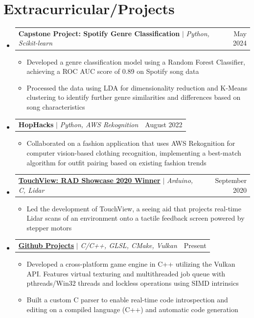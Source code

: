 \documentclass[letterpaper,11pt]{article}
\makeatletter
\newcommand{\resumeItem}[1]{
  \item\small{
    {#1 \vspace{-2pt}}
  }
}
\newcommand{\resumeProjectHeading}[2]{
    \item
    \begin{tabular*}{0.97\textwidth}{l@{\extracolsep{\fill}}r}
      \small#1 & #2 \\
    \end{tabular*}\vspace{-7pt}
}
\newcommand{\resumeSubHeadingListStart}{\begin{itemize}[leftmargin=0.15in, label={}]}
\newcommand{\resumeSubHeadingListEnd}{\end{itemize}}
\newcommand{\resumeItemListStart}{\begin{itemize}}
\newcommand{\resumeItemListEnd}{\end{itemize}\vspace{-5pt}}
\makeatother
\begin{document}
\section{Extracurricular/Projects} %
    \resumeSubHeadingListStart

        \resumeProjectHeading
        {\textbf{Capstone Project: Spotify Genre Classification} $|$ \footnotesize\emph{Python, Scikit-learn}}{May 2024}
        \resumeItemListStart
            \resumeItem{Developed a genre classification model using a Random Forest Classifier, achieving a ROC AUC score of 0.89 on Spotify song data}
            \resumeItem{Processed the data using LDA for dimensionality reduction and K-Means clustering to identify further genre similarities and differences based on song characteristics}
        \resumeItemListEnd
    
          
        \resumeProjectHeading
        {\textbf{HopHacks} $|$ \footnotesize\emph{Python, AWS Rekognition}}{August 2022}
        \resumeItemListStart
            \resumeItem{Collaborated on a fashion application that uses AWS Rekognition for computer vision-based clothing recognition, implementing a best-match algorithm for outfit pairing based on existing fashion trends}
        \resumeItemListEnd
          
        \resumeProjectHeading
        {\textbf{\href{https://engineering.nyu.edu/news/first-year-students-demonstrate-first-out-gate-thinking-during-fall-2020-rad-challenge}{TouchView: RAD Showcase 2020 Winner}} $|$ \footnotesize\emph{Arduino, C, Lidar}}{September 2020}
        \resumeItemListStart
            \resumeItem{Led the development of TouchView, a seeing aid that projects real-time Lidar scans of an environment onto a tactile feedback screen powered by stepper motors}
        \resumeItemListEnd

        \resumeProjectHeading
        {\textbf{\href{https://github.com/edrickhong}{Github Projects}} $|$ \footnotesize\emph{C/C++, GLSL, CMake, Vulkan}}{Present}
        \resumeItemListStart
            \resumeItem{Developed a cross-platform game engine in C++ utilizing the Vulkan API. Features virtual texturing and multithreaded job queue with pthreads/Win32 threads and lockless operations using SIMD intrinsics}
	    \resumeItem{Built a custom C parser to enable real-time code introspection and editing on a compiled language (C++) and automatic code generation}
        \resumeItemListEnd
    \resumeSubHeadingListEnd
\end{document}
